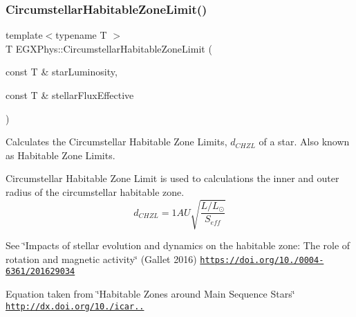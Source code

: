 \subsubsection{\texorpdfstring{Circumstellar\+Habitable\+Zone\+Limit()}{CircumstellarHabitableZoneLimit()}}
{\footnotesize\ttfamily template$<$typename T $>$ \\
T E\+G\+X\+Phys\+::\+Circumstellar\+Habitable\+Zone\+Limit (\begin{DoxyParamCaption}\item[{const T \&}]{star\+Luminosity,  }\item[{const T \&}]{stellar\+Flux\+Effective }\end{DoxyParamCaption})}



Calculates the Circumstellar Habitable Zone Limits, $d_{CHZL}$ of a star. Also known as Habitable Zone Limits. 

Circumstellar Habitable Zone Limit is used to calculations the inner and outer radius of the circumstellar habitable zone. \[d_{CHZL}=1AU \sqrt{ \frac{L/L_\odot}{S_{eff}} }\]

See \char`\"{}\+Impacts of stellar evolution and dynamics on the habitable zone\+: The role of rotation and magnetic activity\char`\"{} (Gallet 2016) \href{https://doi.org/10.1051/0004-6361/201629034}{\tt https\+://doi.\+org/10./0004-\/6361/201629034}

Equation taken from \char`\"{}\+Habitable Zones around Main Sequence Stars\char`\"{} \href{http://dx.doi.org/10.1006/icar.1993.1010}{\tt http\+://dx.\+doi.\+org/10./icar..}


